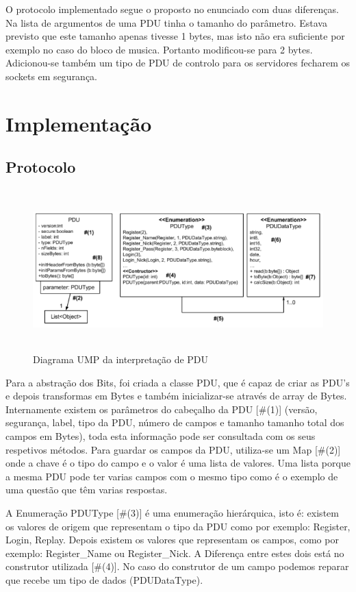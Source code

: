 \documentclass[runningheads,a4paper]{llncs}
\begin{document}
O protocolo implementado segue o proposto no enunciado com duas diferenças.
Na lista de argumentos de uma PDU tinha o tamanho do parâmetro. Estava previsto que este tamanho apenas tivesse 1 bytes, mas isto não era suficiente por exemplo no caso do bloco de musica. Portanto modificou-se para 2 bytes.
Adicionou-se também um tipo de PDU de controlo para os servidores fecharem os sockets em segurança. 

\section{Implementação}

\subsection{Protocolo}


\begin{figure}
\centering
\includegraphics[height=6.2cm]{UDP.png}
\caption{Diagrama UMP da interpretação de PDU}
\label{fig:diagram-pdu}
\end{figure}

Para a abstração dos Bits, foi criada a classe PDU, que é capaz de criar as PDU’s e depois transformas em Bytes e também inicializar-se através de array de Bytes.
Internamente existem os parâmetros do cabeçalho da PDU [\#(1)] (versão, segurança, label, tipo da PDU, número de campos e tamanho tamanho total dos campos em Bytes), toda esta informação pode ser consultada com os seus respetivos métodos.
Para guardar os campos da PDU, utiliza-se um Map [\#(2)] onde a chave é o tipo do campo e o valor é uma lista de valores. Uma lista porque a mesma PDU pode ter varias campos com o mesmo tipo como é o exemplo de uma questão que têm varias respostas.

A Enumeração PDUType [\#(3)] é uma enumeração hierárquica, isto é: existem os valores de origem que representam o tipo da PDU como por exemplo: Register, Login, Replay. Depois existem os valores que representam os campos, como por exemplo: Register\_Name ou Register\_Nick.
A Diferença entre estes dois está no construtor utilizada [\#(4)]. No caso do construtor de um campo podemos reparar que recebe um tipo de dados (PDUDataType).
\end{document}
